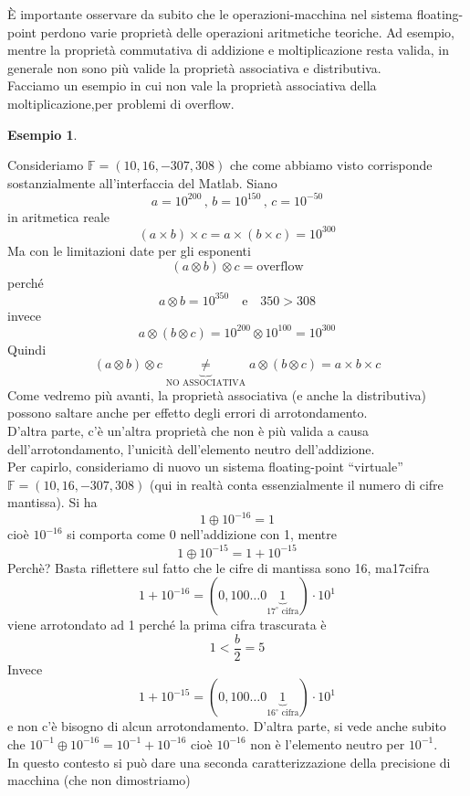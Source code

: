 \documentclass[12pt]{article}
\newtheorem*{esempio}{Esempio}
\begin{document}
È importante osservare da subito che le operazioni-macchina nel sistema floating-point perdono varie proprietà delle operazioni aritmetiche teoriche. Ad esempio, mentre la proprietà commutativa di addizione e moltiplicazione resta valida, in generale non sono più valide la proprietà associativa e distributiva.\\
Facciamo un esempio in cui non vale la proprietà associativa della moltiplicazione,per problemi di overflow.
\begin{esempio} \end{esempio}
Consideriamo $\mathbb{F} = (10, 16, -307, 308)$ che come abbiamo visto corrisponde sostanzialmente all'interfaccia del Matlab. Siano
\[ a = 10^{200}\,,\,b = 10^{150}\,,\,c = 10^{-50} \]
in aritmetica reale \[ (a \times b) \times c = a \times (b \times c) = 10^{300} \]
Ma con le limitazioni date per gli esponenti \[(a \otimes b) \otimes c = \text{overflow}\]
perché  \[a \otimes b = 10^{350} \quad \text{e} \quad 350 >308\]
invece \[ a \otimes (b \otimes c) = 10^{200} \otimes 10^{100} = 10^{300} \]
Quindi \[ (a \otimes b) \otimes c \underbrace{\ne}_{\text{NO ASSOCIATIVA}} a \otimes (b \otimes c) = a \times b \times c \]
\newline \newline
Come vedremo più avanti, la proprietà associativa (e anche la distributiva) possono saltare anche per effetto degli errori di arrotondamento.\\
D’altra parte, c’è un’altra proprietà che non è più valida a causa dell’arrotondamento, l’unicità dell'elemento neutro dell'addizione.\\
Per capirlo, consideriamo di nuovo un sistema floating-point “virtuale” $\mathbb{F} = (10, 16, -307, 308)$ (qui in realtà conta essenzialmente il numero di cifre mantissa). Si ha 
\[ 1 \oplus 10^{-16} = 1\]
cioè $10^{-16}$ si comporta come 0 nell'addizione con 1, mentre 
\[ 1 \oplus 10^{-15} = 1 + 10^{-15}\]
Perchè? Basta riflettere sul fatto che le cifre di mantissa sono 16, ma17cifra
\[ 1 + 10^{-16} = (0,100 \dotsc 0 \underbrace{1}_{17^\circ\text{ cifra}}) \cdot 10^1\]
viene arrotondato ad 1 perché la prima cifra trascurata è \[ 1 < \frac{b}{2} = 5 \]
Invece \[ 1 + 10^{-15} = (0,100 \dotsc 0 \underbrace{1}_{16^\circ\text{ cifra}}) \cdot 10^1\] 
e non c’è bisogno di alcun arrotondamento.
D’altra parte, si vede anche subito che $ 10^{-1} \oplus 10^{-16} = 10^{-1} + 10^{-16} $ cioè $10^{-16}$ non è l’elemento neutro per $10^{-1}$.\\
In questo contesto si può dare una seconda caratterizzazione della precisione di macchina (che non dimostriamo)
\end{document}
